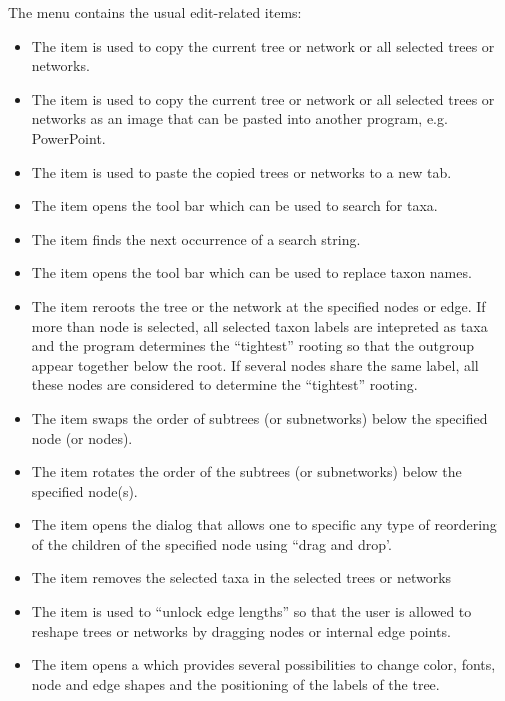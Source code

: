 \documentclass[11pt]{article}
\newcommand{\cs}[1]{\textcolor{red}{#1}}
\begin{document}
The  menu contains the usual edit-related items:
\begin{itemize}
\item The  item is used to copy the current tree or network or all selected trees or networks.
\item The  item is used to copy the current tree or network or all selected trees or networks as an image that can be pasted into another program, e.g. PowerPoint.
\item The  item is used to paste the copied trees or networks to a new tab.
\item The  item opens the
 tool bar which can be used to search for taxa.
\item The  item finds the next occurrence of a search
string.
\item The  item opens the
 tool bar which can be used to replace taxon names.
\item The  item reroots the tree or the network at the specified nodes or edge. If more than node is selected, all selected taxon labels
are intepreted as taxa and the program
determines the ``tightest'' rooting so that the outgroup appear
together below the root. If several nodes share the same label, all these nodes are considered to determine the ``tightest'' rooting. 
\item The  item swaps the order of subtrees (or subnetworks) below the specified node (or nodes).
\item The  item rotates the order of the subtrees (or subnetworks) below the specified node(s).
\item The  item
opens  the  dialog that allows one to specific any type of reordering
of the children of the specified node using ``drag and drop'.%
\item The  item removes the selected taxa in the selected trees or networks%
\item The   item is used to ``unlock edge lengths'' so that
the user is allowed to reshape trees or networks by dragging nodes or internal edge points.

\item The  item opens a  which provides several 
possibilities to change color, fonts, node and edge shapes and the positioning of the labels of the tree.
\end{itemize}
\end{document}
